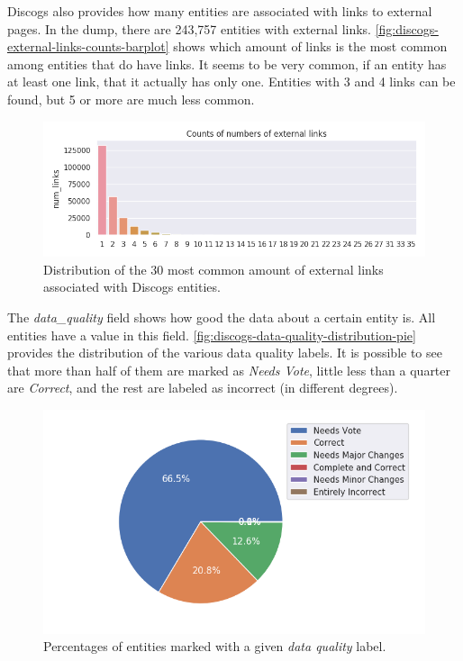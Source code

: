 \documentclass[epsfig,a4paper,11pt,titlepage,twoside,openany]{book}
\begin{document}
Discogs also provides how many entities are associated with links to external pages. In the dump, there are 243,757 entities with external links. \autoref{fig:discogs-external-links-counts-barplot} shows which amount of links is the most common among entities that do have links. It seems to be very common, if an entity has at least one link, that it actually has only one. Entities with 3 and 4 links can be found, but 5 or more are much less common.

\begin{figure}[H]
  \centering \includegraphics[width=\textwidth]{discogs_external_links_counts} 
  \caption{Distribution of the 30 most common amount of external links associated with Discogs entities.}
  \label{fig:discogs-external-links-counts-barplot}
\end{figure}

The \textit{data\_quality} field shows how good the data about a certain entity is. All entities have a value in this field. \autoref{fig:discogs-data-quality-distribution-pie} provides the distribution of the various data quality labels. It is possible to see that more than half of them are marked as \textit{Needs Vote}, little less than a quarter are \textit{Correct}, and the rest are labeled as incorrect (in different degrees).

\begin{figure}[H]
  \centering \includegraphics[width=.8\textwidth]{discogs_data_quality_distribution} 
  \caption{Percentages of entities marked with a given \textit{data quality} label.}
  \label{fig:discogs-data-quality-distribution-pie}
\end{figure}
\end{document}
